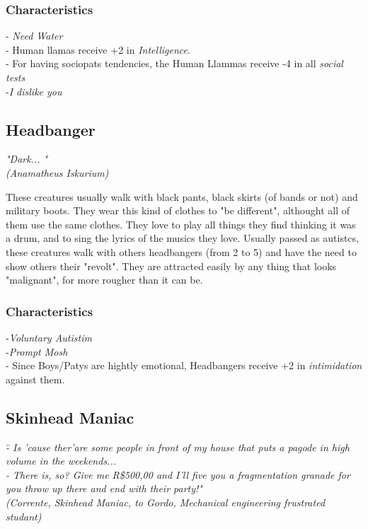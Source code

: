 \documentclass[ letterpaper,12pt]{article}
\begin{document}
\subsubsection{Characteristics}
- {\it Need Water}\\
- Human llamas receive +2 in {\it Intelligence}.\\
- For having sociopats tendencies, the Human Llammas receive -4 in all {\it social tests}\\
-{\it I dislike you}\\

\subsection{Headbanger}
{\it "Dark... "\\
(Anamatheus Iskurium)\\}

These creatures usually walk with black pants, black skirts (of bands or not) and military boots. They wear this kind of clothes to "be different", althought all of them use the same clothes. They love to play all things they find thinking it was a drum, and to sing the lyrics of the musics they love. Usually passed as autistcs, these creatures walk with others headbangers (from 2 to 5) and have the need to show others their "revolt". They are attracted easily by any thing that looks "malignant", for more rougher than it can be.

\subsubsection{Characteristics}
-{\it Voluntary Autistim}\\
-{\it Prompt Mosh}\\
- Since Boys/Patys are hightly emotional, Headbangers receive +2 in {\it intimidation} against them.

\subsection{Skinhead Maniac}
{\it \" - Is 'cause ther'are some people in front of my house that puts a pagode in high volume in the weekends...\\
 - There is, so? Give me R\$500,00 and I'll five you a fragmentation granade for you throw up there and end with their party!"\\
(Corrente, Skinhead Maniac, to Gordo, Mechanical engineering frustrated studant)}\\
\end{document}
